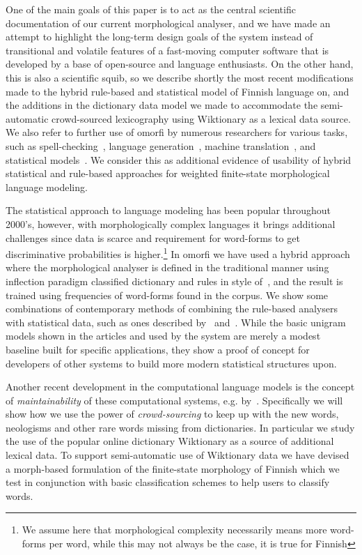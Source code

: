 \documentclass[a4paper,12pt]{article}
\begin{document}
One of the main goals of this paper is to act as the central scientific
documentation of our current morphological analyser, and we have made an
attempt to highlight the long-term design goals of the system instead of
transitional and volatile features of a fast-moving computer software that is
developed by a base of open-source and language enthusiasts. On the other hand,
this is also a scientific squib, so we describe shortly the most recent
modifications made to the hybrid rule-based and statistical model of Finnish
language on, and the additions in the dictionary data model we made to
accommodate the semi-automatic crowd-sourced lexicography using Wiktionary as a
lexical data source.  We also refer to further use of omorfi by numerous
researchers for various tasks, such as
spell-checking~\citep{pirinen2014weighted}, language
generation~\citep{toivanen2012corpus}, machine
translation~\cite{clifton2011combining}, and statistical
models~\citep{haverinen2013building,bohnet2013joint}. We consider this as
additional evidence of usability of hybrid statistical and rule-based
approaches for weighted finite-state morphological language modeling.

The statistical approach to language modeling has been popular throughout
2000's, however, with morphologically complex languages it brings additional
challenges since data is scarce and requirement for word-forms to get
discriminative probabilities is higher.\footnote{We assume here that
morphological complexity necessarily means more word-forms per word, while this
may not always be the case, it is true for Finnish} In omorfi we have used a
hybrid approach where the morphological analyser is defined in the traditional
manner using inflection paradigm classified dictionary and rules in style
of~\citet{koskenniemi1983twolevel}, and the result is trained using frequencies
of word-forms found in the corpus. We show some combinations of contemporary
methods of combining the rule-based analysers with statistical data, such as
ones described by~\citet{pirinen2009weighted} and~\citet{pirinen2012improving}.
While the basic unigram models shown in the articles and used by the system are
merely a modest baseline built for specific applications, they show a proof of
concept for developers of other systems to build more modern statistical
structures upon.


Another recent development in the computational language models is the concept
of \emph{maintainability} of these computational systems, e.g.
by~\cite{maxwell2008joint,pirinen2011modularisation}. Specifically we will show
how we use the power of \emph{crowd-sourcing} to keep up with the new words,
neologisms and other rare words missing from dictionaries. In particular we
study the use of the popular online dictionary Wiktionary as a source of
additional lexical data. To support semi-automatic use of Wiktionary data we
have devised a morph-based formulation of the finite-state morphology of
Finnish which we test in conjunction with basic classification schemes to help
users to classify words.
\end{document}

